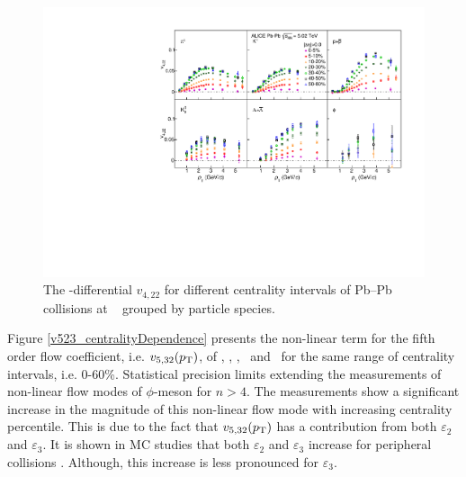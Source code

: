 \begin{figure}[!htb]
\begin{center}
\includegraphics[scale=0.82]{figures/results/All_v422_gap00_CentDep_PID2.pdf}
\end{center}
\caption{The \pT-differential $v_{4,22}$ for different centrality intervals of Pb--Pb collisions at \sNN~ grouped by particle species.}
\label{v422_centralityDependence}
\end{figure}
 
Figure \ref{v523_centralityDependence} presents the non-linear term for the fifth order flow coefficient, i.e. $v_{5,32}(p_{\rm{T}})$, of \pion, \kaon, \proton, \lambdas~and \Ks~for the same range of centrality intervals, i.e. 0-60\%. Statistical precision limits extending the measurements of non-linear flow modes of $\phi$-meson for $n>4$. The measurements show a significant increase in the magnitude of this non-linear flow mode with increasing centrality percentile. This is due to the fact that $v_{5,32}(p_{\rm{T}})$ has a contribution from both $\varepsilon_{2}$ and $\varepsilon_{3}$. It is shown in MC studies that both $\varepsilon_{2}$ and $\varepsilon_{3}$ increase for peripheral collisions \cite{Alver:2010gr}. Although, this increase is less pronounced for $\varepsilon_{3}$.

